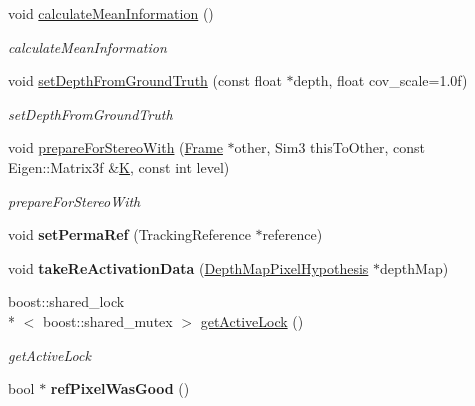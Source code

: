 \begin{DoxyCompactItemize}
void \hyperlink{classlsd__slam_1_1_frame_a4ff87802d5bcafda551ffb2506f7192e}{calculate\-Mean\-Information} ()
\begin{DoxyCompactList}\small\item\em calculate\-Mean\-Information \end{DoxyCompactList}\item 
void \hyperlink{classlsd__slam_1_1_frame_a7e563deb5eadcaddc85d7618bb021b1b}{set\-Depth\-From\-Ground\-Truth} (const float $\ast$depth, float cov\-\_\-scale=1.\-0f)
\begin{DoxyCompactList}\small\item\em set\-Depth\-From\-Ground\-Truth \end{DoxyCompactList}\item 
void \hyperlink{classlsd__slam_1_1_frame_a377c85038536721d99473f810cb45241}{prepare\-For\-Stereo\-With} (\hyperlink{classlsd__slam_1_1_frame}{Frame} $\ast$other, Sim3 this\-To\-Other, const Eigen\-::\-Matrix3f \&\hyperlink{classlsd__slam_1_1_frame_adeb235dc3e4a4d8fcf622b5771299c31}{K}, const int level)
\begin{DoxyCompactList}\small\item\em prepare\-For\-Stereo\-With \end{DoxyCompactList}\item 
\hypertarget{classlsd__slam_1_1_frame_a3e56b78f4f1989fa15fa3da5dfb97c81}{void {\bfseries set\-Perma\-Ref} (Tracking\-Reference $\ast$reference)}\label{classlsd__slam_1_1_frame_a3e56b78f4f1989fa15fa3da5dfb97c81}

\item 
\hypertarget{classlsd__slam_1_1_frame_aab79f2a5a9f59c2cf2b9714ad48c53ae}{void {\bfseries take\-Re\-Activation\-Data} (\hyperlink{classlsd__slam_1_1_depth_map_pixel_hypothesis}{Depth\-Map\-Pixel\-Hypothesis} $\ast$depth\-Map)}\label{classlsd__slam_1_1_frame_aab79f2a5a9f59c2cf2b9714ad48c53ae}

\item 
boost\-::shared\-\_\-lock\\*
$<$ boost\-::shared\-\_\-mutex $>$ \hyperlink{classlsd__slam_1_1_frame_af73ccb75e1e449d9a8f2044246ee3530}{get\-Active\-Lock} ()
\begin{DoxyCompactList}\small\item\em get\-Active\-Lock \end{DoxyCompactList}\item 
\hypertarget{classlsd__slam_1_1_frame_a8c3122c4784b9a8ae66210205bf531d1}{bool $\ast$ {\bfseries ref\-Pixel\-Was\-Good} ()}\label{classlsd__slam_1_1_frame_a8c3122c4784b9a8ae66210205bf531d1}


\end{DoxyCompactItemize}

